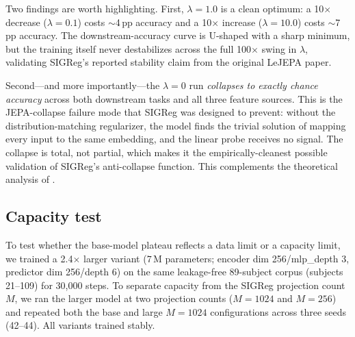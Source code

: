 Two findings are worth highlighting. First, $\lambda{=}1.0$ is a clean
optimum: a 10$\times$ decrease ($\lambda{=}0.1$) costs $\sim$4\,pp accuracy
and a 10$\times$ increase ($\lambda{=}10.0$) costs $\sim$7\,pp accuracy.
The downstream-accuracy curve is U-shaped with a sharp minimum, but the
training itself never destabilizes across the full 100$\times$ swing in
$\lambda$, validating SIGReg's reported stability claim from the original
LeJEPA paper.

Second---and more importantly---the $\lambda{=}0$ run \emph{collapses to
exactly chance accuracy} across both downstream tasks and all three
feature sources. This is the JEPA-collapse failure mode that SIGReg was
designed to prevent: without the distribution-matching regularizer, the
model finds the trivial solution of mapping every input to the same
embedding, and the linear probe receives no signal. The collapse is
total, not partial, which makes it the empirically-cleanest possible
validation of SIGReg's anti-collapse function. This complements the
theoretical analysis of \cite{lejepa2025}.

\subsection{Capacity test}
\label{sec:results:capacity}

To test whether the base-model plateau reflects a data limit or a capacity
limit, we trained a 2.4$\times$ larger variant ($7$\,M parameters; encoder
dim 256/mlp\_depth 3, predictor dim 256/depth 6) on the same leakage-free
89-subject corpus (subjects 21--109) for 30{,}000 steps. To separate
capacity from the SIGReg projection count $M$, we ran the larger model at
two projection counts ($M{=}1024$ and $M{=}256$) and repeated both the base
and large $M{=}1024$ configurations across three seeds (42--44). All
variants trained stably.

